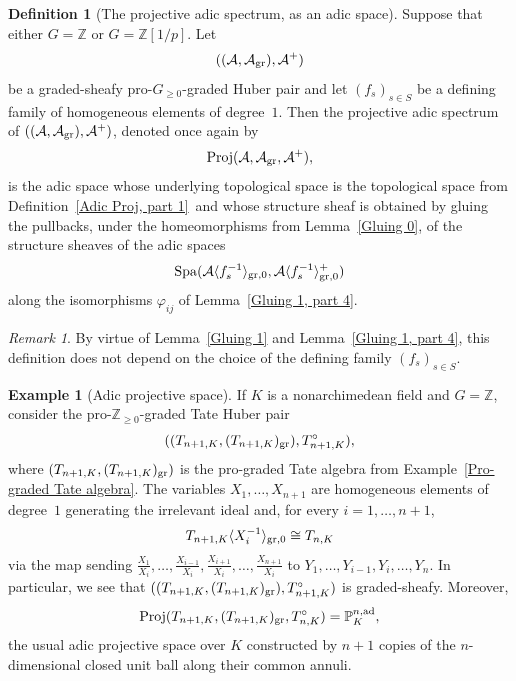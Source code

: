 \documentclass[12pt,twoside,a4paper]{article}
\theoremstyle{definition}
\newtheorem{mydef}[thm]{Definition}
\newtheorem{example}[thm]{Example}
\theoremstyle{remark}
\newtheorem{rmk}[thm]{Remark}
\newcommand\ad{{\rm ad}}
\newcommand\gr{{\rm gr}}
\newcommand\Proj{{\rm Proj}}
\newcommand\Spa{{\rm Spa}}
\begin{document}
\begin{mydef}[The projective adic spectrum, as an adic space]\label{Adic Proj, part 2}Suppose that either $G=\mathbb{Z}$ or $G=\mathbb{Z}[1/p]$. Let \begin{equation*}((\mathcal{A}, \mathcal{A}_{\gr}), \mathcal{A}^{+})\end{equation*}be a graded-sheafy pro-$G_{\geq0}$-graded Huber pair and let $(f_{s})_{s\in S}$ be a defining family of homogeneous elements of degree~$1$. Then the projective adic spectrum of $((\mathcal{A}, \mathcal{A}_{\gr}), \mathcal{A}^{+})$, denoted once again by \begin{equation*}\Proj(\mathcal{A}, \mathcal{A}_{\gr}, \mathcal{A}^{+}),\end{equation*}is the adic space whose underlying topological space is the topological space from Definition~\ref{Adic Proj, part 1} and whose structure sheaf is obtained by gluing the pullbacks, under the homeomorphisms from Lemma~\ref{Gluing 0}, of the structure sheaves of the adic spaces\begin{equation*}\Spa(\mathcal{A}\langle f_{s}^{-1}\rangle_{\gr, 0}, \mathcal{A}\langle f_{s}^{-1}\rangle_{\gr, 0}^{+})\end{equation*}along the isomorphisms $\varphi_{ij}$ of Lemma~\ref{Gluing 1, part 4}.\end{mydef}
\begin{rmk}By virtue of Lemma~\ref{Gluing 1} and Lemma~\ref{Gluing 1, part 4}, this definition does not depend on the choice of the defining family $(f_{s})_{s\in S}$.\end{rmk}
\begin{example}[Adic projective space]\label{Adic projective space}If $K$ is a nonarchimedean field and $G=\mathbb{Z}$, consider the pro-$\mathbb{Z}_{\geq0}$-graded Tate Huber pair \begin{equation*}((T_{n+1, K}, (T_{n+1, K})_{\gr}), T_{n+1, K}^{\circ}),\end{equation*}where $(T_{n+1, K}, (T_{n+1, K})_{\gr})$ is the pro-graded Tate algebra from Example~\ref{Pro-graded Tate algebra}. The variables $X_{1},\dots, X_{n+1}$ are homogeneous elements of degree~$1$ generating the irrelevant ideal and, for every $i=1,\dots, n+1$, \begin{equation*}T_{n+1, K}\langle X_{i}^{-1}\rangle_{\gr, 0}\cong T_{n, K}\end{equation*}via the map sending $\frac{X_{1}}{X_{i}}, \dots, \frac{X_{i-1}}{X_{i}}, \frac{X_{i+1}}{X_{i}}, \dots, \frac{X_{n+1}}{X_{i}}$ to $Y_{1},\dots, Y_{i-1}, Y_{i},\dots, Y_{n}$. In particular, we see that $((T_{n+1, K}, (T_{n+1, K})_{\gr}), T_{n+1, K}^{\circ})$ is graded-sheafy. Moreover, \begin{equation*}\Proj(T_{n+1, K}, (T_{n+1, K})_{\gr}, T_{n, K}^{\circ})=\mathbb{P}_{K}^{n,\ad},\end{equation*}the usual adic projective space over $K$ constructed by $n+1$ copies of the $n$-dimensional closed unit ball along their common annuli. \end{example}
\end{document}
